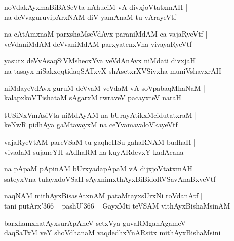 \documentclass[twoside,12pt,openright]{book}
\newcounter{shloka}[chapter]
\begin{document}
\begin{shloka}
noVdakAyxmaBiBASeVta nAhuciM vA divxjoVtatxmAH |\\
na deVvaguruvipArxNAM diV yamAnaM tu vArayeVtf 
\end{shloka}

\begin{shloka}
na cAtAmxnaM parxshaMseVdAvx paraniMdAM ca vajaRyeVtf |\\
veVdaniMdAM deVvaniMdAM parxyatenxVna vivayaRyeVtf 
\end{shloka}

\begin{shloka}
yasutx deVvAsaqSiVMshecxYva veVdAnAvx niMdati divxjaH |\\
na tasayx niSakxqqtidaqSATxvX shAsetxrXVSivxha muniVshavxrAH
\end{shloka}

\begin{shloka}
niMdayeVdAvx guruM deVvaM veVdaM vA soVpabaqMhaNaM |\\
kalapxkoVTishataM sAgarxM rwraveV pacayxteV naraH 
\end{shloka}

\begin{shloka}
tUSiNxVmAsiVta niMdAyAM na bUrayAtikxMcidutatxraM |\\
keNwR pidhAya gaMtavayxM na ceYvamavaloVkayeVtf 
\end{shloka}

\begin{shloka}
vajaRyeVtAM pareVSaM tu gaqheHSu gahaRNAM  budhaH |\\
vivadaM sujaneYH sAdhaRM na kuyARdevxY kadAcana 
\end{shloka}

\begin{shloka}
na pApaM pApinAM bUrxyadapApaM vA dijxjoVtatxmAH |\\
sateyxVna tulayxdoVSaH sAyxnimxthAyxBiBidoRVSavAnaBxveVtf
\end{shloka}

\begin{shloka}
naqNAM mithAyxBisasAtxnAM pataMtayxsUrxNi roVdanAtf |\\
tani putArx\char'366 ~ pashU\char'366 ~ GayxMti teVSAM  vithAyxBishaMsinAM 
\end{shloka}

\begin{shloka}
barxhamxhatAyxsurApAneV setxVya guvaRMganAgameV |\\
daqSaTxM veY shoVdhanaM vaqdedhxYnARsitx mithAyxBishaMsini
\end{shloka}
\end{document}
